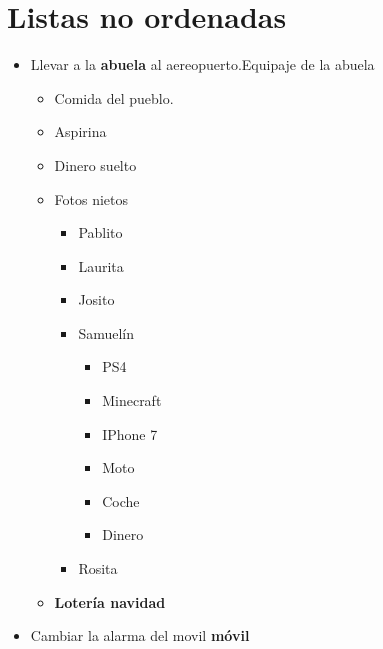 \documentclass[10pt,a4paper]{article}
\begin{document}
 \section{Listas no ordenadas}
  \begin{itemize}
   \item Llevar a la {\bf abuela} al aereopuerto.Equipaje de la abuela
    \begin{itemize}
     \item Comida del pueblo.
     \item Aspirina
     \item Dinero suelto
     \item Fotos nietos
      \begin{itemize}
       \item Pablito
       \item Laurita
       \item Josito
       \item Samuelín
        \begin{itemize}
         \item PS4
         \item Minecraft
         \item IPhone 7
         \item Moto
         \item Coche
         \item Dinero
        \end{itemize}
       \item Rosita
      \end{itemize}
     \item {\bf Lotería navidad}
	\end{itemize}
   \item Cambiar la alarma del movil {\bf móvil}
  \end{itemize}
\end{document}
